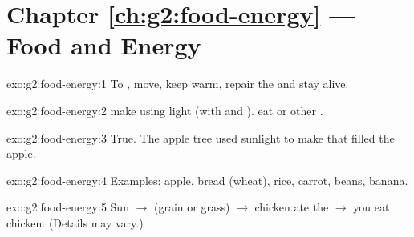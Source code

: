 \section*{Chapter \ref{ch:g2:food-energy} --- Food and Energy}

\begin{solution}{exo:g2:food-energy:1}
To , move, keep warm, repair the  and stay alive.
\end{solution}

\begin{solution}{exo:g2:food-energy:2}
 make  using light (with  and ).  eat
 or other .
\end{solution}

\begin{solution}{exo:g2:food-energy:3}
True. The apple tree used sunlight to make  that filled the
apple.
\end{solution}

\begin{solution}{exo:g2:food-energy:4}
Examples: apple, bread (wheat), rice, carrot, beans, banana.
\end{solution}

\begin{solution}{exo:g2:food-energy:5}
Sun $\to$  (grain or grass) $\to$ chicken ate the  
$\to$ you eat chicken. (Details may vary.)
\end{solution}

